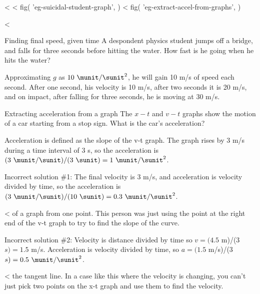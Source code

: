 <%
<%
  fig(
    'eg-suicidal-student-graph',
  )
\spacebetweenfigs
<%
  fig(
    'eg-extract-accel-from-graphs',
  )

<%
\begin{eg}{Finding final speed, given time}\label{eg:suicidal-student-graph}
\egquestion A despondent physics student jumps off a bridge,
and falls for three seconds before hitting the water. How
fast is he going when he hits the water?

\eganswer Approximating $g$ as $10\ \munit/\sunit^2$, he will gain 10
m/s of speed each second. After one second, his velocity is
10 m/s, after two seconds it is 20 m/s, and on impact, after
falling for three seconds, he is moving at 30 m/s.
\end{eg}

\begin{eg}{Extracting acceleration from a graph}\label{eg:extract-accel-from-graphs}
\egquestion The $x-t$ and $v-t$ graphs show the motion of a car
starting from a stop sign. What is the car's acceleration?

\eganswer Acceleration is defined as the slope of the v-t
graph. The graph rises by 3 m/s during a time interval of 3
s, so the acceleration is $(3\ \munit/\sunit)/(3\ \sunit)=1\ \munit/\sunit^2$.

\noindent Incorrect solution \#1: The final velocity is 3 m/s, and
acceleration is velocity divided by time, so the acceleration
is $(3\ \munit/\sunit)/(10\ \sunit)=0.3\ \munit/\sunit^2$.

<%
of a graph from one point. This person was just using the
point at the right end of the v-t graph to try to find
the slope of the curve.

\noindent Incorrect solution \#2: Velocity is distance divided by time
so $v=(4.5$ m)/(3 $s)=1.5$ m/s. Acceleration is velocity
divided by time, so $a=(1.5$ m/s)/(3 $s)=0.5\ \munit/\sunit^2$.

\noindent<%
the tangent line. In a case like this where the velocity is
changing, you can't just pick two points on the x-t graph
and use them to find the velocity.
\end{eg}

